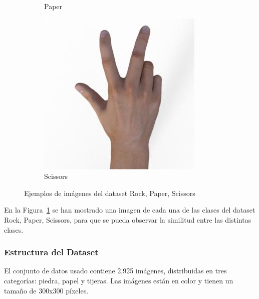 \begin{figure}[htp]
\begin{subfigure}[t]{0.3\textwidth}
        \caption*{Paper}
    \end{subfigure}
    \begin{subfigure}[t]{0.3\textwidth}
        \centering
        \includegraphics[width=\linewidth]{imagenes/dataset_examples/scissors.jpg}
        \caption*{Scissors}
    \end{subfigure}
    \caption{Ejemplos de imágenes del dataset Rock, Paper, Scissors}
    \label{fig:ejemplos-rps}
\end{figure}

En la Figura~\ref{fig:ejemplos-rps} se han mostrado una imagen de cada una de las clases del dataset Rock, Paper, Scissors,
para que se pueda observar la similitud entre las distintas clases.

\subsubsection{Estructura del Dataset}
El conjunto de datos usado contiene 2,925 imágenes, distribuidas en tres categorías: piedra, papel y tijeras.
Las imágenes están en color y tienen un tamaño de 300x300 píxeles.

